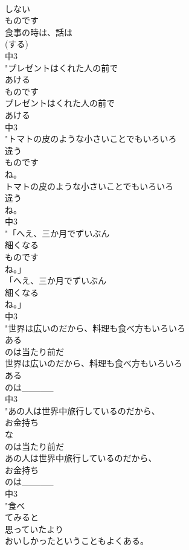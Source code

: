 \documentclass[8pt]{extreport}
\begin{document}
\begin{CJK}{UTF8}{min}
\\	しない
\\	ものです
\\	食事の時は、話は
\\	(する)
\\	中3
\\	"プレゼントはくれた人の前で
\\	あける
\\	ものです
\\	プレゼントはくれた人の前で
\\	あける
\\	中3
\\	"トマトの皮のような小さいことでもいろいろ
\\	違う
\\	ものです
\\	ね。
\\	トマトの皮のような小さいことでもいろいろ
\\	違う
\\	ね。
\\	中3
\\	"「へえ、三か月でずいぶん
\\	細くなる
\\	ものです
\\	ね。」
\\	「へえ、三か月でずいぶん
\\	細くなる
\\	ね。」
\\	中3
\\	"世界は広いのだから、料理も食べ方もいろいろ
\\	ある
\\	のは当たり前だ
\\	世界は広いのだから、料理も食べ方もいろいろ
\\	ある
\\	のは_____
\\	中3
\\	"あの人は世界中旅行しているのだから、
\\	お金持ち
\\	な
\\	のは当たり前だ
\\	あの人は世界中旅行しているのだから、
\\	お金持ち
\\	のは_____
\\	中3
\\	"食べ
\\	てみると
\\	思っていたより
\\	おいしかったということもよくある。

\end{CJK}
\end{document}
